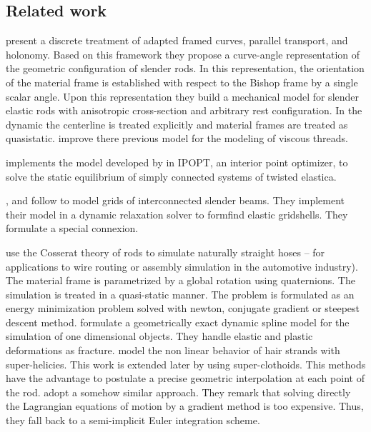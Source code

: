\subsection{Related work}
 present a discrete treatment of adapted framed curves, parallel transport, and holonomy. Based on this framework they propose a curve-angle representation of the geometric configuration of slender rods. In this representation, the orientation of the material frame is established with respect to the Bishop frame by a single scalar angle. Upon this representation they build a mechanical model for slender elastic rods with anisotropic cross-section and arbitrary rest configuration. In the dynamic the centerline is treated explicitly and material frames are treated as quasistatic.  improve there previous model for the modeling of viscous threads.

 implements the model developed by \cite{Bergou2008} in IPOPT, an interior point optimizer, to solve the static equilibrium of simply connected systems of twisted elastica.

,  and  follow \cite{Bergou2008} to model grids of interconnected slender beams. They implement their model in a dynamic relaxation solver to formfind elastic gridshells. They formulate a special connexion.

 use the Cosserat theory of rods to simulate naturally straight hoses -- for applications to wire routing or assembly simulation in the automotive industry). The material frame is parametrized by a global rotation using quaternions. The simulation is treated in a quasi-static manner. The problem is formulated as an energy minimization problem solved with newton, conjugate gradient or steepest descent method.  formulate a geometrically exact dynamic spline model for the simulation of one dimensional objects. They handle elastic and plastic deformations as fracture.  model the non linear behavior of hair strands with super-helicies. This work is extended later by  using super-clothoids. This methods have the advantage to postulate a precise geometric interpolation at each point of the rod.  adopt a somehow similar approach. They remark that solving directly the Lagrangian equations of motion by a gradient method is too expensive. Thus, they fall back to a semi-implicit Euler integration scheme.

